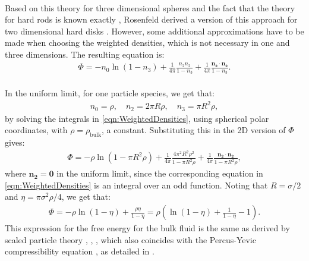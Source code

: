 \documentclass[11pt, a4paper]{article}
\theoremstyle{definition}
\begin{document}
\\
Based on this theory for three dimensional spheres and the fact that the theory for hard rods is known exactly \cite{Percus1976}, Rosenfeld derived a version of this approach for two dimensional hard disks \cite{Rosenfeld2DInterp}. However, some additional approximations have to be made when choosing the weighted densities, which is not necessary in one and three dimensions. The resulting equation is:
\begin{align*}
	\Phi = - n_0 \ln(1-n_3) + \frac{1}{4 \pi} \frac{n_2 n_2}{1-n_3} + \frac{1}{4 \pi} \frac{\mathbf{n_2} \cdot \mathbf{n_2}}{1-n_3}.
\end{align*}
\\
In the uniform limit, for one particle species, we get that:
\begin{align*}
	n_0 = \rho, \quad n_2 = 2 \pi R \rho, \quad n_3 = \pi R^2 \rho,
\end{align*}
by solving the integrals in \eqref{eqn:WeightedDensities}, using spherical polar coordinates, with $\rho = \rho_{\text{bulk}}$, a constant. 
Substituting this in the 2D version of $\Phi$ gives:
\begin{align*}
	\Phi = - \rho \ln (1- \pi R^2 \rho) + \frac{1}{4 \pi} \frac{4\pi^2 R^2 \rho^2}{1 - \pi R^2 \rho} + \frac{1}{4 \pi}\frac{\mathbf{n_2} \cdot \mathbf{n_2}}{1 - \pi R^2 \rho},
\end{align*}
where $\mathbf{n_2} = \mathbf 0$ in the uniform limit, since the corresponding equation in \eqref{eqn:WeightedDensities} is an integral over an odd function.
Noting that $R = \sigma/2$ and $\eta = \pi \sigma^2 \rho /4$, we get that:
\begin{align*}
	\Phi = - \rho \ln (1- \eta) + \frac{\rho \eta}{1 - \eta} = \rho \left(\ln(1-\eta) + \frac{1}{1- \eta} -1 \right).
\end{align*} 
This expression for the free energy for the bulk fluid is the same as derived by scaled particle theory \cite{Reiss1959}, \cite{Reiss1960}, \cite{Helfand1961}, which also coincides with the Percus-Yevic compressibility equation \cite{PercusYevick1}, as detailed in \cite{RosenfeldSPT}.
\end{document}
